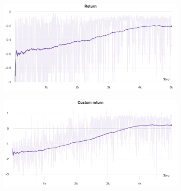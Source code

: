 \documentclass[a4paper,10pt]{report}
\begin{document}
\begin{figure}[h]
	\begin{subfigure}{0.48\textwidth}
	\includegraphics[width=\linewidth]{bt-medium-returns.png}
	\end{subfigure}\hspace*{\fill}
	\begin{subfigure}{0.48\textwidth}
	\includegraphics[width=\linewidth]{bt-medium-custom-returns.png}
	\end{subfigure}
	

\end{figure}
\end{document}
